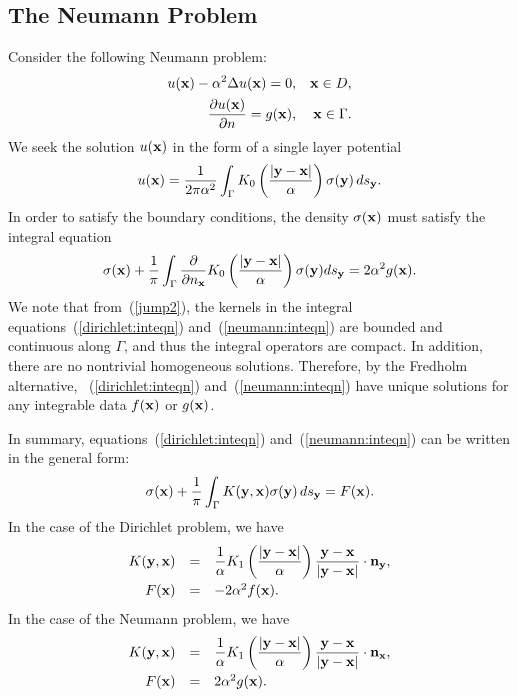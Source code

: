 \documentclass[preprint,12pt]{elsarticle}
\newcommand{\x}{{\bf x}}
\newcommand{\y}{{\bf y}}
\newcommand{\pderiv}[2]{\frac{\partial #1}{\partial #2}}
\newcommand{\eqr}[1]{~(\ref{#1})}
\begin{document}
\subsection{The Neumann Problem}
Consider the following Neumann problem:
\begin{eqnarray*}
  u(\x) - \alpha^2 \Delta u(\x) = 0, &&{\x} \in D, \\
  \frac{\partial u(\x)}{\partial n} = g(\x), && \x \in \Gamma.
\end{eqnarray*}
We seek the solution $u(\x)$ in the form of a single layer potential
\begin{align*}
  u(\x)=\frac{1}{2\pi\alpha^2}\int_{\Gamma} K_{0}
  \left(\frac{|\y-\x|}{\alpha} \right) \sigma(\y) \, ds_{\y}.
\end{align*}
In order to satisfy the boundary conditions, the density
$\sigma(\x)$ must satisfy the integral equation
\begin{equation}
  \label{neumann:inteqn}
 \sigma(\x) + \frac{1}{\pi}
  \int_{\Gamma}\pderiv{}{n_{\x}}K_{0}\left(\frac{|\y - \x|}{\alpha}
  \right)\sigma(\y)ds_{\y}= 2\alpha^2 g(\x) .
\end{equation}
We note that from\eqr{jump2}, the kernels in the integral equations\eqr{dirichlet:inteqn} and\eqr{neumann:inteqn} are bounded and continuous along
$\Gamma$, and thus the integral operators are compact.
In addition, there are no nontrivial
homogeneous solutions. Therefore, by the Fredholm alternative,
\eqr{dirichlet:inteqn} and\eqr{neumann:inteqn} have unique solutions for any integrable data
$f(\x)$ or $g(\x)$.

In summary, equations\eqr{dirichlet:inteqn} and\eqr{neumann:inteqn} can be
written in the general form:
\begin{equation}
   \sigma(\x) + \frac{1}{\pi} \int_{\Gamma} K(\y,\x) \sigma(\y) \, ds_{\y} = F(\x). 
\label{gen_int_eqn}
\end{equation}
In the case of the Dirichlet problem, we have
\[
   \begin{array}{rcl}
      K(\y,\x) & = & \displaystyle{\frac{1}{\alpha} K_1 \left( \frac{|\y - \x|}{\alpha} \right)
                         \frac{\y-\x }{|\y - \x|} \cdot {\bf n}_{\y}, }  \smallskip \\
             F(\x) & = & -2\alpha^2 f(\x) .
   \end{array}
\]
In the case of the Neumann problem, we have 
\[
    \begin{array}{rcl}
      K(\y,\x) & = & \displaystyle{\frac{1}{\alpha} K_1 \left( \frac{|\y - \x|}{\alpha} \right)
                         \frac{\y-\x }{|\y - \x|} \cdot {\bf n}_{\x}, }   \smallskip \\
      F(\x) & = & 2\alpha^2 g(\x) .
    \end{array}
\]
\end{document}
